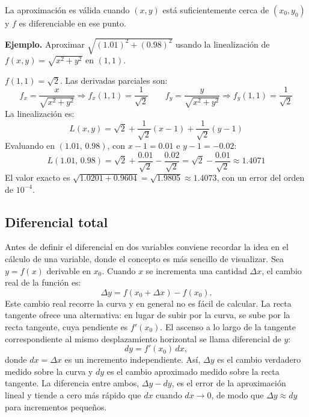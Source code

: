 La aproximación es válida cuando $(x, y)$ está suficientemente cerca de $(x_0, y_0)$ y $f$ es diferenciable en ese punto.

\textbf{Ejemplo.} Aproximar $\sqrt{(1.01)^2 + (0.98)^2}$ usando la linealización de $f(x, y) = \sqrt{x^2 + y^2}$ en $(1, 1)$.

$f(1,1) = \sqrt{2}$. Las derivadas parciales son:
\[
f_x = \frac{x}{\sqrt{x^2 + y^2}} \Rightarrow f_x(1,1) = \frac{1}{\sqrt{2}}
\qquad
f_y = \frac{y}{\sqrt{x^2 + y^2}} \Rightarrow f_y(1,1) = \frac{1}{\sqrt{2}}
\]
La linealización es:
\[
L(x, y) = \sqrt{2} + \frac{1}{\sqrt{2}}(x - 1) + \frac{1}{\sqrt{2}}(y - 1)
\]
Evaluando en $(1.01,\, 0.98)$, con $x - 1 = 0.01$ e $y - 1 = -0.02$:
\[
L(1.01,\, 0.98) = \sqrt{2} + \frac{0.01}{\sqrt{2}} - \frac{0.02}{\sqrt{2}} = \sqrt{2} - \frac{0.01}{\sqrt{2}} \approx 1.4071
\]
El valor exacto es $\sqrt{1.0201 + 0.9604} = \sqrt{1.9805} \approx 1.4073$, con un error del orden de $10^{-4}$.

\subsection{Diferencial total}

Antes de definir el diferencial en dos variables conviene recordar la idea en el cálculo de una variable, donde el concepto es más sencillo de visualizar. Sea $y = f(x)$ derivable en $x_0$. Cuando $x$ se incrementa una cantidad $\Delta x$, el cambio real de la función es:
\[
\Delta y = f(x_0 + \Delta x) - f(x_0).
\]
Este cambio real recorre la curva y en general no es fácil de calcular. La recta tangente ofrece una alternativa: en lugar de subir por la curva, se sube por la recta tangente, cuya pendiente es $f'(x_0)$. El ascenso a lo largo de la tangente correspondiente al mismo desplazamiento horizontal se llama diferencial de $y$:
\[
dy = f'(x_0)\,dx,
\]
donde $dx = \Delta x$ es un incremento independiente. Así, $\Delta y$ es el cambio verdadero medido sobre la curva y $dy$ es el cambio aproximado medido sobre la recta tangente. La diferencia entre ambos, $\Delta y - dy$, es el error de la aproximación lineal y tiende a cero más rápido que $dx$ cuando $dx \to 0$, de modo que $\Delta y \approx dy$ para incrementos pequeños.

